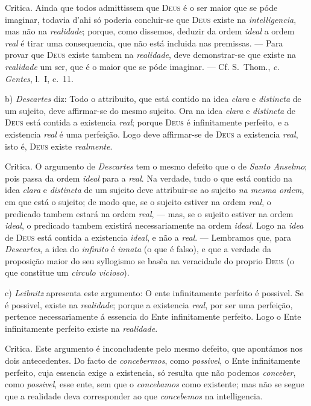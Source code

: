 {Critica. Ainda que todos admittissem que \textsc{Deus} é o ser maior que se póde
imaginar, todavia d'ahi só poderia concluir-se que \textsc{Deus} existe na
\emph{intelligencia}, mas não na \emph{realidade}; porque, como dissemos, deduzir da
ordem \emph{ideal} a ordem \emph{real} é tirar uma consequencia, que não está incluida
nas premissas.
 --- Para provar que \textsc{Deus} existe tambem na \emph{realidade}, deve
demonstrar-se que existe na \emph{realidade} um ser, que é o maior que se póde
imaginar. --- Cf. S.~Thom., \emph{c. Gentes}, l.~I, c.~11.

b) \emph{Descartes} diz: Todo o attribuito, que está contido na idea \emph{clara} e
\emph{distincta} de um sujeito, deve affirmar-se do mesmo sujeito. Ora na idea
\emph{clara} e \emph{distincta} de \textsc{Deus} está contida a existencia
\emph{real}; porque \textsc{Deus} é infinitamente perfeito, e a existencia \emph{real}
é uma perfeição. Logo deve affirmar-se de \textsc{Deus} a existencia \emph{real}, isto
é, \textsc{Deus} existe \emph{realmente}.

Critica. O argumento de \emph{Descartes} tem o mesmo defeito que o de \emph{Santo
Anselmo}; pois passa da ordem \emph{ideal} para a \emph{real}. Na verdade, tudo o que
está contido na idea \emph{clara} e \emph{distincta} de um sujeito deve attribuir-se ao
sujeito \emph{na mesma ordem}, em que está o sujeito; de modo que, se o sujeito estiver
na ordem \emph{real}, o predicado tambem estará na ordem \emph{real}, --- mas, se o
sujeito estiver na ordem \emph{ideal}, o predicado tambem existirá necessariamente na
ordem \emph{ideal}. Logo na \emph{idea} de \textsc{Deus} está contida a existencia
\emph{ideal}, e não a \emph{real}. --- Lembramos que, para \emph{Descartes}, a idea do
\emph{infinito} é \emph{innata} (o que é falso), e que a verdade da proposição maior do
seu syllogismo se basêa na veracidade do proprio \textsc{Deus} (o que constitue um
\emph{circulo vicioso}).

c) \emph{Leibnitz} apresenta este argumento: O ente infinitamente perfeito é possivel.
Se é possivel, existe na \emph{realidade}; porque a existencia \emph{real}, por ser uma
perfeição, pertence necessariamente á essencia do Ente infinitamente perfeito. Logo o
Ente infinitamente perfeito existe na \emph{realidade}.

Critica. Este argumento é inconcludente pelo mesmo defeito, que apontámos nos dois
antecedentes. Do facto de \emph{concebermos}, como \emph{possivel}, o Ente
infinitamente perfeito, cuja essencia exige a existencia, só resulta que não podemos
\emph{conceber}, como \emph{possivel}, esse ente, sem que o \emph{concebamos} como
existente; mas não se segue que a realidade deva corresponder ao que
\emph{concebemos} na intelligencia.}

